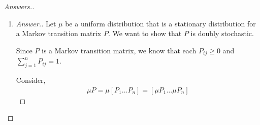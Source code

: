 \documentclass[10pt,twoside]{article}
\begin{document}
\begin{itemize}
\begin{proof}[Answers.]
\begin{enumerate}
\begin{proof}[Answer.]
\begin{gather*}
                \mu = 
                \begin{bmatrix}
                    \mu_1 \\
                    \vdots \\
                    \mu_n
                \end{bmatrix}
                =
                \begin{bmatrix}
                \frac{1}{n} \\
                \vdots \\
                \frac{1}{n}
                \end{bmatrix}
            \end{gather*}
            \fi
            is a stationary distribution for a doubly stochastic matrix $P$. Let $P = [P_1 \ldots P_n]$ where each $P_j$ for $j=1,\ldots, n$ is the $j^{th}$ column vector of $P$. Consider, 
            \begin{gather*}
                \mu P = \mu[P_1 \ldots P_n] = [\mu P_1\ldots, \mu P_n] 
            \end{gather*}
            And so for each $i=1,\ldots, n$,
            \begin{gather*}
                (\mu P)_i = \sum_{j=1}^n\mu_i P_j =  \mu_i\sum_{j=1}^n P_j = \mu_i(1) = \mu_i
            \end{gather*}
            Thus, the uniform distribution is a stationary distribution for a doubly stochastic matrix $P$.
        \end{proof}
        \item \begin{proof}[Answer.]
            Let $\mu$ be a uniform distribution that is a stationary distribution for a Markov transition matrix $P$. We want to show that $P$ is doubly stochastic.\smallskip

            Since $P$ is a Markov transition matrix, we know that each $P_{ij}\geq 0$ and $\sum_{j=1}^n P_{ij} = 1$.

            Consider, 
            \begin{gather*}
                \mu P = 
                \mu
                [P_1 \ldots P_n] = [\mu P_1 \ldots \mu P_n]
            \end{gather*}
            

\end{proof}
\end{enumerate}
\end{proof}
\end{itemize}
\end{document}
